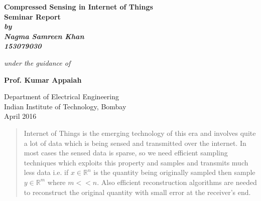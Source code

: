 \documentclass[12pt]{article}
\theoremstyle{definition}
\begin{document}
\begin{titlepage}
\thispagestyle{empty}
\vspace*{0.7cm}
{\centering     
\large
{\Large\bf Compressed Sensing in Internet of Things}\\
\vspace{3cm}
\bf{Seminar Report}\\
\vspace{0.25cm}
\vspace{0.1cm}
\it
by \\
\vspace{.5cm}
\rm
{\large \bf {Nagma Samreen Khan}}\\
{\large \bf {153079030}}

\vspace{1cm}

{\it{under the guidance of}} \\
\vspace{.5cm}

\hspace{.05cm} {\large \bf {Prof. Kumar Appaiah}}\\
\vspace {0.5cm}

\begin{figure}[h] 
{\par}
\end{figure} 

Department of Electrical Engineering \\ 
Indian Institute of Technology, Bombay\\ 
{\centering
\hspace{6.5cm}April 2016} 
}
\pagebreak 
\end{titlepage}

\begin{abstract}
Internet of Things is the emerging technology of this era and involves quite a lot of data which is being 
sensed and transmitted over the internet.
In most cases the sensed data is sparse, so we need efficient sampling techniques which exploits this property
and samples and transmits much less data i.e. if $x \in \mathbb{R}^n$ is
the quantity being originally sampled then sample $y \in \mathbb{R}^m$ where $m << n$. 
Also efficient reconstruction
algorithms are needed to reconstruct the original quantity with small error at the receiver's end.
\end{abstract}
\end{document}
